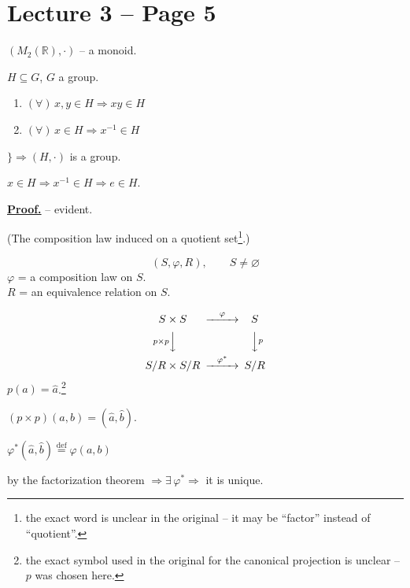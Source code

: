 \documentclass[12pt]{article}
\begin{document}
\section*{Lecture 3 -- Page 5}

\noindent $(M_2(\mathbb{R}),\cdot)$ -- a monoid.

\noindent $H\subseteq G$, $G$ a group.

\begin{enumerate}
\item[1)] $(\forall)\, x,y\in H \Rightarrow xy\in H$
\item[2)] $(\forall)\, x\in H \Rightarrow x^{-1}\in H$
\end{enumerate}
\hspace{1cm}$\Bigg\} \Rightarrow (H,\cdot)$ is a group.

\noindent $x\in H \Rightarrow x^{-1}\in H \Rightarrow e\in H$.

\bigskip
\noindent\underline{\textbf{Proof.}} -- evident.

\bigskip
\noindent (The composition law induced on a quotient set\footnote{the exact word is unclear in the original -- it may be ``factor'' instead of ``quotient''.}.)

\[
(S,\varphi,R), \qquad S\neq\varnothing
\]
\noindent $\varphi$ = a composition law on $S$.\\
$R$ = an equivalence relation on $S$.

\[
\begin{CD}
S\times S @>\varphi>> S\\
@V{p\times p}VV @VV{p}V\\
S/R\times S/R @>\varphi^*>> S/R
\end{CD}
\]
\noindent $p(a) = \hat a$.\footnote{the exact symbol used in the original for the canonical projection is unclear -- $p$ was chosen here.}

\noindent $(p\times p)(a,b) = (\hat a,\hat b)$.

\noindent $\varphi^*(\hat a,\hat b) \overset{\text{def}}{=} \varphi(a,b)$

\noindent by the factorization theorem $\Rightarrow \exists\, \varphi^* \Rightarrow$ it is unique.

\begin{center}
\end{center}
\end{document}
